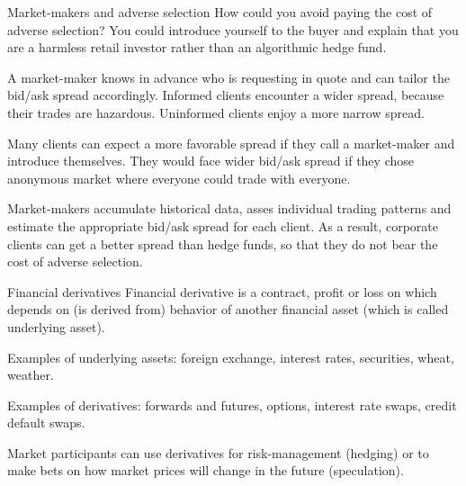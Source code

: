 \documentclass{beamer}
\begin{document}
\begin{frame}{Market-makers and adverse selection}
\justify
How could you avoid paying the cost of adverse selection? You could introduce yourself to the buyer and explain that you are a 
harmless retail investor rather than an algorithmic hedge fund.

\justify
A market-maker knows in advance \alert{who} is requesting in quote and can tailor the bid/ask spread accordingly. Informed clients encounter a wider spread, because their trades are hazardous. Uninformed clients enjoy a more narrow spread.

\justify
Many clients can expect a more favorable spread if they call a market-maker and introduce themselves. They would face wider bid/ask spread if they chose anonymous market where everyone could trade with everyone.

\justify
Market-makers accumulate historical data, asses individual trading patterns and estimate the appropriate bid/ask spread for each client. As a result, corporate clients can get a better spread than hedge funds, so that they do not bear the cost of adverse selection.
\end{frame}



\begin{frame}{Financial derivatives}
\justify
\alert{Financial derivative} is a contract, profit or loss on which depends on (is derived from) behavior of another financial asset (which is called \alert{underlying} asset).

\justify
Examples of underlying assets: foreign exchange, interest rates, securities, wheat, weather.

\justify
Examples of derivatives: forwards and futures, options, interest rate swaps, credit default swaps.

\justify
Market participants can use derivatives for risk-management (hedging) or to make bets on how market prices will change in the future (speculation). 
\end{frame}
\end{document}
